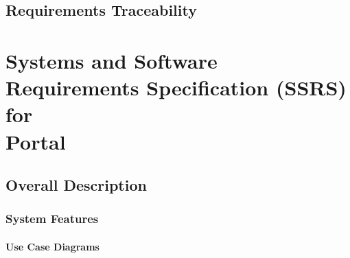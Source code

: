 \documentclass[12pt, oneside, letterpaper]{report}
\begin{document}
\chapter{Requirements Traceability}
		

\part{Systems and Software Requirements Specification (SSRS) \\ for \\ Portal}

\chapter{Overall Description}

\begin{comment}

	\section{Product Perspective}
		
	\section{Product Functions}
		
	\section{User Characteristics}
		
	\section{Constraints}
		
	\section{Assumptions and Dependencies}
		
	\section{System Level (Non-Functional) Requirements}
		
\chapter{Specific Requirements}
	\section{External Interface Requirements}
		

\end{comment}

	\section{System Features}
		\subsection{Use Case Diagrams}
		

\end{document}
